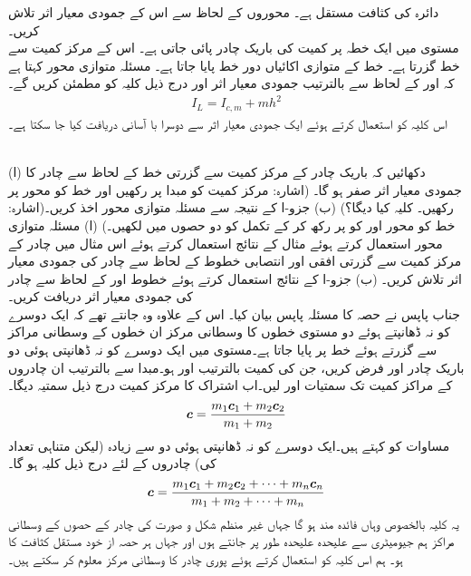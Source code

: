 دائرہ   کی کثافت مستقل ہے۔ محوروں کے لحاظ سے اس کے جمودی معیار اثر تلاش کریں۔ 
\\
مستوی  میں  ایک خطہ  پر  کمیت  کی باریک چادر پائی جاتی ہے۔ اس کے مرکز کمیت سے خط   گزرتا ہے۔ خط  کے متوازی    اکائیاں دور خط  پایا جاتا ہے۔ مسئلہ متوازی محور کہتا ہے  کہ  اور  کے لحاظ سے  بالترتیب جمودی معیار اثر  اور  درج ذیل کلیہ کو مطمئن کریں گے۔
\begin{align}
I_L=I_{c,m}+mh^2
\end{align}
اس کلیہ کو استعمال کرتے ہوئے ایک جمودی معیار اثر سے دوسرا با آسانی دریافت کیا جا سکتا ہے۔

\\
(ا) دکھائیں کہ باریک چادر کے مرکز کمیت سے گزرتی خط کے لحاظ سے  چادر کا جمودی معیار اثر صفر ہو گا۔ (اشارہ: مرکز کمیت کو مبدا پر رکھیں اور  خط کو محور  پر رکھیں۔ کلیہ  کیا دیگا؟) (ب)  جزو-ا کے نتیجہ سے مسئلہ متوازی محور  اخذ کریں۔(اشارہ:  خط  کو محور  اور  کو  پر رکھ کر  کے تکمل کو دو حصوں میں  لکھیں۔)
(ا) مسئلہ متوازی محور استعمال کرتے ہوئے مثال  کے نتائج استعمال کرتے ہوئے  اس مثال میں چادر کے مرکز کمیت سے گزرتی افقی اور انتصابی خطوط کے لحاظ سے چادر کی جمودی معیار اثر تلاش کریں۔ (ب) جزو-ا کے نتائج استعمال کرتے ہوئے خطوط  اور  کے لحاظ سے چادر کی جمودی معیار اثر دریافت کریں۔
\\
جناب پاپس نے حصہ   کا مسئلہ پاپس بیان کیا۔ اس کے علاوہ وہ جانتے تھے کہ  ایک دوسرے کو نہ ڈھانپتے ہوئے دو  مستوی خطوں  کا وسطانی مرکز ان خطوں کے وسطانی مراکز سے گزرتے ہوئے خط پر پایا جاتا ہے۔مستوی  میں ایک دوسرے کو نہ ڈھانپتی ہوئی   دو باریک چادر   اور  فرض کریں،  جن کی کمیت بالترتیب  اور  ہو۔مبدا سے بالترتیب  ان چادروں کے مراکز کمیت تک سمتیات     اور  لیں۔اب اشتراک  کا مرکز کمیت درج ذیل سمتیہ دیگا۔
\begin{align}\label{مساوات_بالکثرت_کلیہ_پاپس}
{\ensuremath{{\boldsymbol{c}}}}=\frac{m_1{{\boldsymbol{c}}}_1+m_2{{\boldsymbol{c}}}_2}{m_1+m_2}
\end{align}
مساوات  کو  کہتے ہیں۔ایک دوسرے کو نہ ڈھانپتی ہوئی دو سے زیادہ (لیکن متناہی تعداد کی)  چادروں کے لئے درج ذیل کلیہ ہو گا۔
\begin{align}\label{مساوات_بالکثرت_عمومی_کلیہ_پاپس}
{\ensuremath{{\boldsymbol{c}}}}=\frac{m_1{{\boldsymbol{c}}}_1+m_2{{\boldsymbol{c}}}_2+\cdots+m_n{{\boldsymbol{c}}}_n}{m_1+m_2+\cdots+m_n}
\end{align}
یہ کلیہ بالخصوص وہاں فائدہ مند ہو گا جہاں   غیر منظم  شکل و صورت کی چادر کے حصوں کے وسطانی مراکز ہم  جیومیٹری سے علیحدہ علیحدہ طور پر جانتے ہوں اور جہاں  ہر حصہ از خود  مستقل کثافت کا ہو۔ ہم اس کلیہ کو استعمال کرتے ہوئے پوری چادر کا وسطانی مرکز معلوم کر سکتے ہیں۔ 

